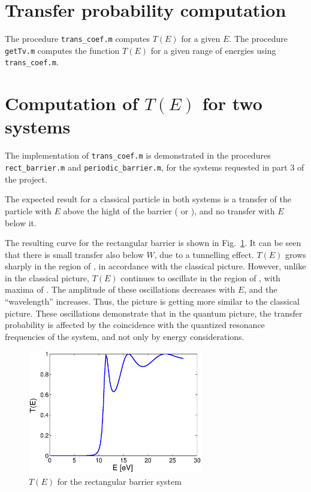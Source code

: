 \documentclass[12pt, a4paper]{article}
\begin{document}
\section{Transfer probability computation}
The procedure \texttt{trans\_coef.m} computes $T(E)$ for a given $E$. The procedure \texttt{getTv.m} computes the function $T(E)$ for a given range of energies using \texttt{trans\_coef.m}.

\section{Computation of $T(E)$ for two systems}
The implementation of \texttt{trans\_coef.m} is demonstrated in the procedures \texttt{rect\_barrier.m} and \texttt{periodic\_barrier.m}, for the systems requested in part 3 of the project.

The expected result for a classical particle in both systems is a transfer of the particle with $E$ above the hight of the barrier ( or ), and no transfer with $E$ below it.

The resulting curve for the rectangular barrier is shown in Fig.~\ref{fig:rectb}. It can be seen that there is small transfer also below $W$, due to a tunnelling effect. $T(E)$ grows sharply in the region of , in accordance with the classical picture. However, unlike in the classical picture, $T(E)$ continues to oscillate in the region of , with maxima of . The amplitude of these oscillations decreases with $E$, and the ``wavelength'' increases. Thus, the picture is getting more similar to the classical picture. These oscillations demonstrate that in the quantum picture, the transfer probability is affected by the coincidence with the quantized resonance frequencies of the system, and not only by energy considerations.

\begin{figure}[htb]
	\centering\includegraphics[width=3in]{rect_barrier}
	\caption{$T(E)$ for the rectangular barrier system}\label{fig:rectb}
\end{figure}
\end{document}
